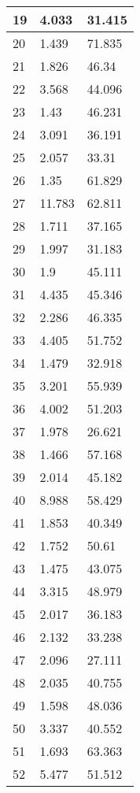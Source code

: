 \begin{table}[!ht]
\begin{tabular}{|l|l|l|}
        19 & 4.033 & 31.415 \\ \hline
        20 & 1.439 & 71.835 \\ \hline
        21 & 1.826 & 46.34 \\ \hline
        22 & 3.568 & 44.096 \\ \hline
        23 & 1.43 & 46.231 \\ \hline
        24 & 3.091 & 36.191 \\ \hline
        25 & 2.057 & 33.31 \\ \hline
        26 & 1.35 & 61.829 \\ \hline
        27 & 11.783 & 62.811 \\ \hline
        28 & 1.711 & 37.165 \\ \hline
        29 & 1.997 & 31.183 \\ \hline
        30 & 1.9 & 45.111 \\ \hline
        31 & 4.435 & 45.346 \\ \hline
        32 & 2.286 & 46.335 \\ \hline
        33 & 4.405 & 51.752 \\ \hline
        34 & 1.479 & 32.918 \\ \hline
        35 & 3.201 & 55.939 \\ \hline
        36 & 4.002 & 51.203 \\ \hline
        37 & 1.978 & 26.621 \\ \hline
        38 & 1.466 & 57.168 \\ \hline
        39 & 2.014 & 45.182 \\ \hline
        40 & 8.988 & 58.429 \\ \hline
        41 & 1.853 & 40.349 \\ \hline
        42 & 1.752 & 50.61 \\ \hline
        43 & 1.475 & 43.075 \\ \hline
        44 & 3.315 & 48.979 \\ \hline
        45 & 2.017 & 36.183 \\ \hline
        46 & 2.132 & 33.238 \\ \hline
        47 & 2.096 & 27.111 \\ \hline
        48 & 2.035 & 40.755 \\ \hline
        49 & 1.598 & 48.036 \\ \hline
        50 & 3.337 & 40.552 \\ \hline
        51 & 1.693 & 63.363 \\ \hline
        52 & 5.477 & 51.512 \\ \hline

\end{tabular}
\end{table}
